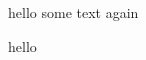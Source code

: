 \documentclass{article}
\begin{document}
hello\autocite{trialurl1}
some text
again\autocite{trialurl1}
\lipsum[1-12]

hello\autocite{trialurl1}
\printbibliography
\end{document}
